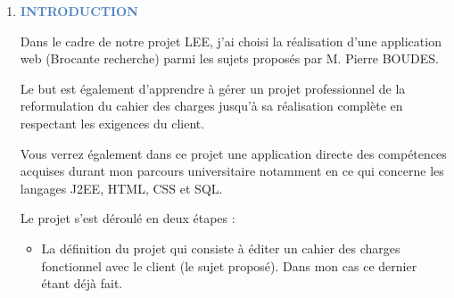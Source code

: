 \documentclass[12pt]{report}
\begin{document}
\vspace{\baselineskip}

\vspace{\baselineskip}

\vspace{\baselineskip}

\vspace{\baselineskip}

\vspace{\baselineskip}
\begin{enumerate}[label*={\fontsize{12pt}{12pt}\selectfont \textbf{\arabic*.}}]
	\item {\fontsize{18pt}{21.6pt}\selectfont \textbf{\textcolor[HTML]{4F81BD}{INTRODUCTION}}\par}\par


\vspace{\baselineskip}
\setlength{\parskip}{9.96pt}
\begin{justify}
Dans le cadre de notre projet LEE, j’ai choisi la réalisation d’une application web (Brocante recherche) parmi les sujets proposés par M. Pierre BOUDES.
\end{justify}\par

\setlength{\parskip}{0.0pt}
\begin{justify}
Le but est également d’apprendre à gérer un projet professionnel de la reformulation du cahier des charges jusqu’à sa réalisation complète en respectant les exigences du client. 
\end{justify}\par


\vspace{\baselineskip}
\begin{justify}
Vous verrez également dans ce projet une application directe des compétences acquises durant mon parcours universitaire notamment en ce qui concerne les langages J2EE, HTML, CSS et SQL.
\end{justify}\par

\begin{justify}
Le projet s’est déroulé en deux étapes :
\end{justify}\par

\begin{itemize}
	\item La définition du projet qui consiste à éditer un cahier des charges fonctionnel avec le client (le sujet proposé). Dans mon cas ce dernier étant déjà fait.\par


\end{itemize}
\end{enumerate}
\end{document}
